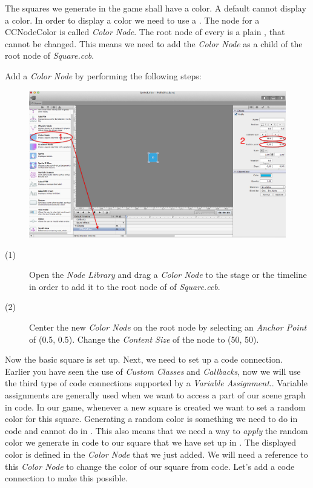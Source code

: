 The squares we generate in the game shall have a color. A default \ccnode{}
cannot display a color. In order to display a color we need to use a
. The \SB{} node for a CCNodeColor is called
\textit{Color Node}. The root node of every \ccbfile{} is a plain \ccnode{},
that cannot be changed. This means we need to add the \textit{Color Node} as a
child of the root node of \textit{Square.ccb}.

\begin{leftbar}
Add a \textit{Color Node} by performing the following steps:
\begin{figure}[H]
		\centering
		\includegraphics[width=0.9\linewidth]{images/firstproject/square_add_colornode.png}
\end{figure}
\begin{description}
\item[(1)] Open the \textit{Node Library} and drag a \textit{Color Node} to the
stage or the timeline in order to add it to the root node of of
\textit{Square.ccb}.
\item[(2)] Center the new \textit{Color Node} on the root node by selecting an
\textit{Anchor Point} of (0.5, 0.5). Change the \textit{Content Size} of the
node to (50, 50).
\end{description}
\end{leftbar}

Now the basic square is set up. Next, we need to set up a code connection. Earlier you have seen
the use of \textit{Custom Classes} and \textit{Callbacks}, now we will use the
third type of code connections supported by \SB{} a \textit{Variable
Assignment}.. Variable assignments
are generally used when we want to access a part of our scene graph in code. In
our game, whenever a new square is created we want to set a random color for
this square. Generating a random color is something we need to do in code and
cannot do in \SB{}. This also means that we need a way to \textit{apply} the random color we
generate in code to our square that we have set up in \SB{}. The displayed color
is defined in the \textit{Color Node} that we just added. We will need a
reference to this \textit{Color Node} to change the color of our square from
code. Let's add a code connection to make this possible.

